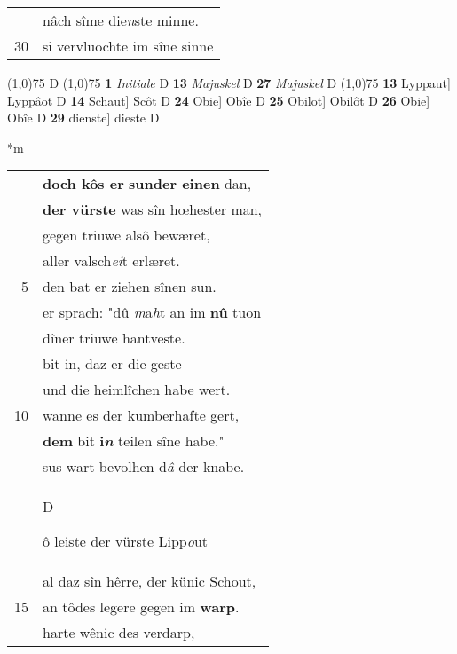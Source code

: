 \documentclass[8pt,a4paper,notitlepage]{article}
\begin{document}
\begin{table}[ht]
\begin{minipage}[t]{0.5\linewidth}
\begin{tabular}{rl}
 & nâch sîme die\textit{n}ste minne.\\ 
30 & si vervluochte im sîne sinne\\ 
\end{tabular}
\scriptsize
\line(1,0){75} \newline
D \newline
\line(1,0){75} \newline
\textbf{1} \textit{Initiale} D  \textbf{13} \textit{Majuskel} D  \textbf{27} \textit{Majuskel} D  \newline
\line(1,0){75} \newline
\textbf{13} Lyppaut] Lyppâot D \textbf{14} Schaut] Scôt D \textbf{24} Obie] Obîe D \textbf{25} Obilot] Obilôt D \textbf{26} Obie] Obîe D \textbf{29} dienste] dieste D \newline
\end{minipage}
\hspace{0.5cm}
\begin{minipage}[t]{0.5\linewidth}
\small
\begin{center}*m
\end{center}
\begin{tabular}{rl}
 & \textbf{doch kôs er} \textbf{sunder einen} dan,\\ 
 & \textbf{der vürste} was sîn hœhester man,\\ 
 & gegen triuwe alsô bewæret,\\ 
 & aller valsch\textit{ei}t erlæret.\\ 
5 & den bat er ziehen sînen sun.\\ 
 & er sprach: "dû \textit{m}a\textit{h}t an im \textbf{nû} tuon\\ 
 & dîner triuwe hantveste.\\ 
 & bit in, daz er die geste\\ 
 & und die heimlîchen habe wert.\\ 
10 & wanne es der kumberhafte gert,\\ 
 & \textbf{dem} bit \textbf{i\textit{n}} teilen sîne habe."\\ 
 & sus wart bevolhen d\textit{â} der knabe.\\ 
 & \begin{large}D\end{large}ô leiste der vürste Lipp\textit{o}ut\\ 
 & al daz sîn hêrre, der künic Schout,\\ 
15 & an tôdes legere gegen im \textbf{warp}.\\ 
 & harte wênic des verdarp,\\ 

\end{tabular}
\end{minipage}
\end{table}
\end{document}
